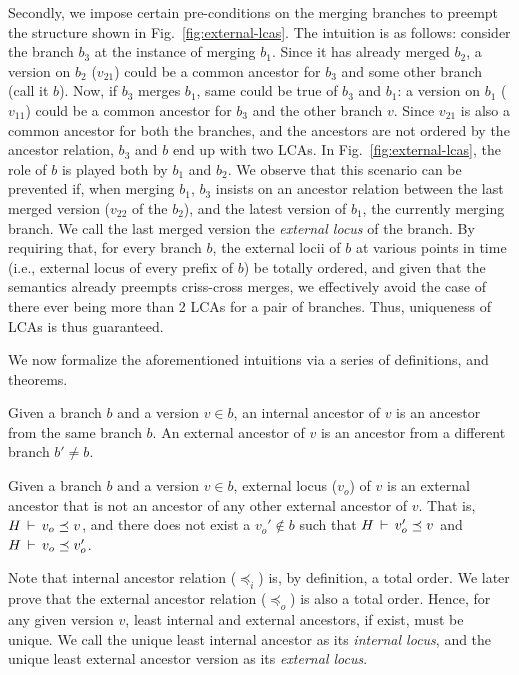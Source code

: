 Secondly, we impose certain pre-conditions on the merging branches to
preempt the structure shown in Fig.~\ref{fig:external-lcas}. The
intuition is as follows: consider the branch $b_3$ at the instance of
merging $b_1$. Since it has already merged $b_2$, a version on $b_2$
($v_{21}$) could be a common ancestor for $b_3$ and some other branch
(call it $b$). Now, if $b_3$ merges $b_1$, same could be true of $b_3$
and $b_1$: a version on $b_1$ ($v_{11}$) could be a common ancestor
for $b_3$ and the other branch $v$. Since $v_{21}$ is also a common
ancestor for both the branches, and the ancestors are not ordered by
the ancestor relation, $b_3$ and $b$ end up with two LCAs. In
Fig.~\ref{fig:external-lcas}, the role of $b$ is played both by $b_1$
and $b_2$. We observe that this scenario can be prevented if, when
merging $b_1$, $b_3$ insists on an ancestor relation between the last
merged version ($v_{22}$ of the $b_2$), and the latest version of
$b_1$, the currently merging branch. We call the last merged version
the \emph{external locus} of the branch. By requiring that, for every
branch $b$, the external locii of $b$ at various points in time (i.e.,
external locus of every prefix of $b$) be totally ordered, and given
that the semantics already preempts criss-cross merges, we effectively
avoid the case of there ever being more than 2 LCAs for a pair of
branches. Thus, uniqueness of LCAs is thus guaranteed.

We now formalize the aforementioned intuitions via a series of
definitions, and theorems.

\begin{definition} 
Given a branch $b$ and a version $v\in b$, an internal ancestor of $v$
is an ancestor from the same branch $b$. An external ancestor of $v$
is an ancestor from a different branch $b'\neq b$. 
\end{definition}

\begin{definition} 
Given a branch $b$ and a version $v\in b$, external locus ($v_o$) of
$v$ is an external ancestor that is not an ancestor of any other
external ancestor of $v$. That is, $H\,\vdash\,v_o \preceq v$, and
there does not exist a $v_o' \not\in b$ such that $H\,\vdash\,v_o'
\preceq v$ and $H\,\vdash\,v_o \preceq v_o'$. 
\end{definition}

Note that internal ancestor relation ($\preceq_i$) is, by definition,
a total order. We later prove that the external ancestor relation
($\preceq_o$) is also a total order. Hence, for any given version $v$,
least internal and external ancestors, if exist, must be unique.  We
call the unique least internal ancestor as its \emph{internal locus},
and the unique least external ancestor version as its \emph{external
locus}. 

